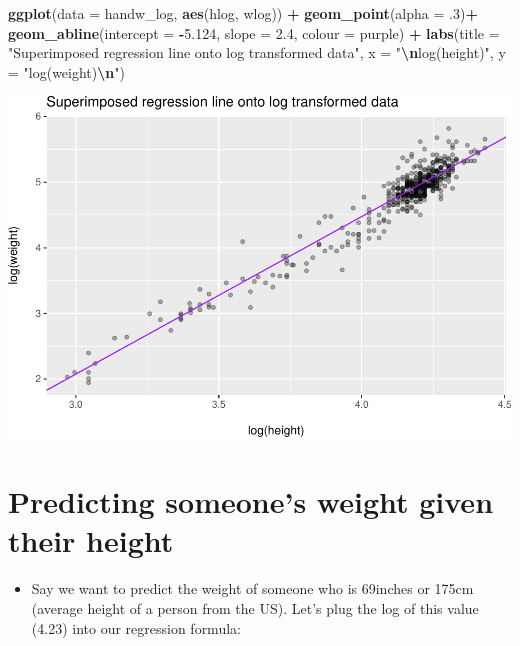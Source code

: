 \documentclass[
]{article}
\newenvironment{Shaded}{\begin{snugshade}}{\end{snugshade}}
\newcommand{\AttributeTok}[1]{\textcolor[rgb]{0.13,0.29,0.53}{#1}}
\newcommand{\DecValTok}[1]{\textcolor[rgb]{0.00,0.00,0.81}{#1}}
\newcommand{\FloatTok}[1]{\textcolor[rgb]{0.00,0.00,0.81}{#1}}
\newcommand{\FunctionTok}[1]{\textcolor[rgb]{0.13,0.29,0.53}{\textbf{#1}}}
\newcommand{\NormalTok}[1]{#1}
\newcommand{\SpecialCharTok}[1]{\textcolor[rgb]{0.81,0.36,0.00}{\textbf{#1}}}
\newcommand{\StringTok}[1]{\textcolor[rgb]{0.31,0.60,0.02}{#1}}
\providecommand{\tightlist}{%
  \setlength{\itemsep}{0pt}\setlength{\parskip}{0pt}}
\begin{document}
\begin{Shaded}
\begin{Highlighting}[]
\FunctionTok{ggplot}\NormalTok{(}\AttributeTok{data =}\NormalTok{ handw\_log, }
       \FunctionTok{aes}\NormalTok{(hlog, wlog)) }\SpecialCharTok{+}
  \FunctionTok{geom\_point}\NormalTok{(}\AttributeTok{alpha =}\NormalTok{ .}\DecValTok{3}\NormalTok{)}\SpecialCharTok{+}
  \FunctionTok{geom\_abline}\NormalTok{(}\AttributeTok{intercept =} \SpecialCharTok{{-}}\FloatTok{5.124}\NormalTok{, }
              \AttributeTok{slope =} \FloatTok{2.4}\NormalTok{, }
              \AttributeTok{colour =} \StringTok{\textquotesingle{}purple\textquotesingle{}}\NormalTok{) }\SpecialCharTok{+}
  \FunctionTok{labs}\NormalTok{(}\AttributeTok{title =} \StringTok{"Superimposed regression line onto log transformed data"}\NormalTok{,}
       \AttributeTok{x =} \StringTok{"}\SpecialCharTok{\textbackslash{}n}\StringTok{log(height)"}\NormalTok{, }
       \AttributeTok{y =} \StringTok{"log(weight)}\SpecialCharTok{\textbackslash{}n}\StringTok{"}\NormalTok{)}
\end{Highlighting}
\end{Shaded}

\includegraphics{L7_Correlation_and_regression_pdf_files/figure-latex/unnamed-chunk-9-1.pdf}

\hypertarget{predicting-someones-weight-given-their-height}{%
\section{Predicting someone's weight given their
height}\label{predicting-someones-weight-given-their-height}}

\begin{itemize}
\tightlist
\item
  Say we want to predict the weight of someone who is 69inches or 175cm
  (average height of a person from the US). Let's plug the log of this
  value (4.23) into our regression formula:
\end{itemize}
\end{document}
